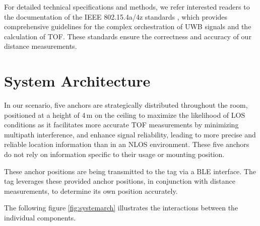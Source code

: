 \documentclass[conference, a4paper]{IEEEtran}
\begin{document}
For detailed technical specifications and methods,
we refer interested readers to the documentation of
the IEEE 802.15.4a/4z standards \cite{IEEE802154a} \cite{IEEE802154z},
which provides comprehensive guidelines for the
complex orchestration of \ac{UWB} signals and the calculation of \ac{TOF}.
These standards ensure the correctness and accuracy of our distance measurements.

\section{System Architecture}\label{section:system_arch}
In our scenario, five anchors are strategically distributed throughout the room,
positioned at a height of 4\,m on the ceiling to maximize the likelihood of 
\ac{LOS} conditions as it facilitates more accurate \ac{TOF} measurements by minimizing multipath interference, and enhance signal reliability, leading to more precise and reliable location information than in an \ac{NLOS} environment.
These five anchors do not rely on information specific to their usage or mounting position.

These anchor positions are being transmitted to the tag via a \ac{BLE} interface. 
The tag leverages these provided anchor positions,
in conjunction with distance measurements,
to determine its own position accurately. 

The following figure \ref{fig:systemarch} illustrates the interactions between the individual components.
\end{document}
